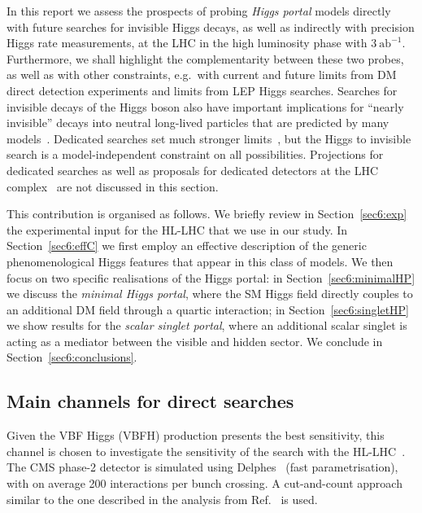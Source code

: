 \documentclass[../report.tex]{subfiles}
\begin{document}
In this report we assess the prospects of probing \emph{Higgs portal} models directly with future searches for invisible Higgs decays, as well as indirectly with precision Higgs rate measurements, at the LHC in the high luminosity phase with $3~\mathrm{ab}^{-1}$. Furthermore, we shall highlight the complementarity between these two probes, as well as with other constraints, e.g.~with current and future limits from DM direct detection experiments and limits from LEP Higgs searches. Searches for invisible decays of the Higgs boson also have important implications for ``nearly invisible'' decays into neutral long-lived particles that are predicted by many models~\cite{Curtin:2018mvb}. Dedicated searches set much stronger limits~\cite{Aad:2015uaa,ATLAS:2016jza,Aaij:2016xmb,CMS:2014hka}, but the Higgs to invisible search is a model-independent constraint on all possibilities.  Projections for dedicated searches as well as proposals for dedicated detectors at the LHC complex~\cite{Chou:2016lxi,Gligorov:2017nwh,Gligorov:2018vkc} are not discussed in this section.

This contribution is organised as follows. We briefly review in Section~\ref{sec6:exp} the experimental input for the HL-LHC that we use in our study. In Section~\ref{sec6:effC} we first employ an effective description of the generic phenomenological Higgs features that appear in this class of models. We then focus on two specific realisations of the Higgs portal: in Section~\ref{sec6:minimalHP} we discuss the \emph{minimal Higgs portal}, where the SM Higgs field directly couples to an additional DM field through a quartic interaction; in Section~\ref{sec6:singletHP} we show results for the \emph{scalar singlet portal}, where an additional scalar singlet is acting as a mediator between the visible and hidden sector. We conclude in Section~\ref{sec6:conclusions}.


\subsection{Main channels for direct searches}\label{sec:expinp}

Given the VBF Higgs (VBFH) production presents the best sensitivity, this channel is chosen to investigate the sensitivity of the search with the HL-LHC~\cite{CMS-PAS-FTR-18-016}. The CMS phase-2 detector is simulated using Delphes~\cite{deFavereau:2013fsa} (fast parametrisation), with on average 200 interactions per bunch crossing.  A
cut-and-count approach similar to the one described in the analysis from Ref.~\cite{Sirunyan:2018owy} is used.
\end{document}
